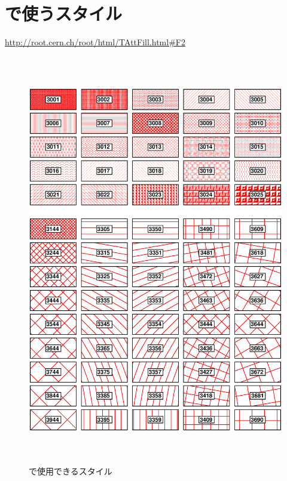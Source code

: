 
 \section{\ROOT で使うスタイル}

 \url{http://root.cern.ch/root/html/TAttFill.html#F2}
 \begin{figure}[htbp]
  \begin{center}
   \includegraphics[height = 180mm]{./picture/fillpatterns.eps}
  \end{center}
  \caption{\ROOT で使用できるスタイル}
  \label{Fig:fillpatterns}
 \end{figure}
